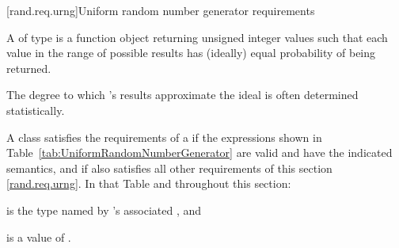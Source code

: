 %




[rand.req.urng]{Uniform random number generator requirements}%
%

\pnum
A 
 of type 
is a function object
returning unsigned integer values
such that each value
in the range of possible results
has (ideally) equal probability
of being returned.
\begin{note}
 The degree to which 's results
 approximate the ideal
 is often determined statistically.
\end{note}

\pnum
A class 
satisfies the requirements
of a 
if the expressions shown
in Table~\ref{tab:UniformRandomNumberGenerator}
are valid and have the indicated semantics,
and if  also satisfies all other requirements
of this section \ref{rand.req.urng}.
In that Table and throughout this section:
\begin{enumeratea}
  \item
     is the type named by
    's associated ,
  and
  \item
     is a value of .
\end{enumeratea}

